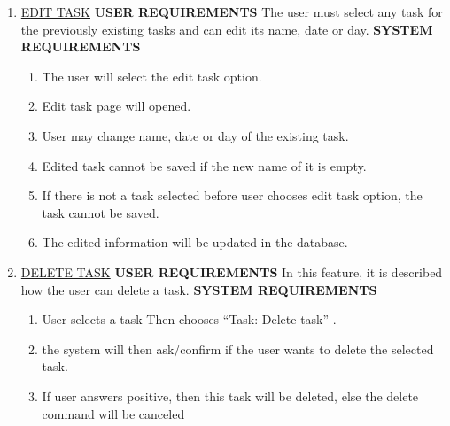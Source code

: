 \documentclass[12pt, a4paper]{report}
\begin{document}
\begin{enumerate}
\begin{enumerate}
	\item \underline{EDIT TASK}  \newline \newline \textbf{USER REQUIREMENTS} \newline \newline The user must select any task for the previously existing tasks and can edit its name, date or day. \newline \newline \textbf{SYSTEM REQUIREMENTS} 
	\begin{enumerate}
	\item The user will select the edit task option.
	\item Edit task page will opened.
	\item User may change name, date or day of the existing task.
	\item Edited task cannot be saved if the new name of it is empty.
	\item If there is not a task selected before user chooses edit task option, the task cannot be saved.
	\item The edited information will be updated in the database.
	\end{enumerate} 

	\item \underline{DELETE TASK}  \newline \newline \textbf{USER REQUIREMENTS} \newline \newline In this feature, it is described how the user can delete a task.    \newline \newline \textbf{SYSTEM REQUIREMENTS} 
	\begin{enumerate}
	\item User selects a task Then chooses “Task: Delete task” . 
	\item the system will then ask/confirm if the user wants to delete the selected task. 
	\item If user answers positive, then this task  will be deleted, else the delete command will be canceled
	\end{enumerate}
	\end{enumerate}


\end{enumerate}
\end{document}
